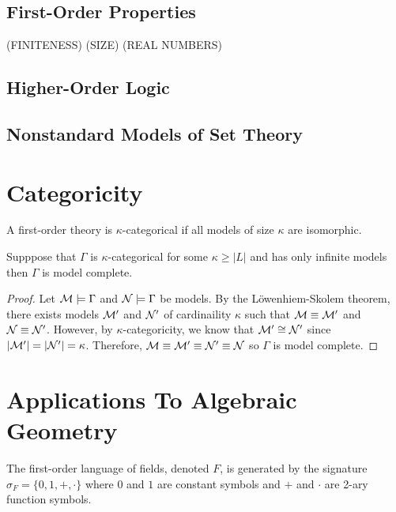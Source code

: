 \documentclass[12pt]{article}
\begin{document}
\subsection{First-Order Properties}

(FINITENESS)
(SIZE)
(REAL NUMBERS)

\subsection{Higher-Order Logic}

\subsection{Nonstandard Models of Set Theory}


\section{Categoricity}

\begin{definition}
A first-order theory is $\kappa$-categorical if all models of size $\kappa$ are isomorphic.
\end{definition}

\begin{theorem}[Vaught]
Supppose that $\Gamma$ is $\kappa$-categorical for some $\kappa \ge |L|$ and has only infinite models then $\Gamma$ is model complete.
\end{theorem}

\begin{proof}
Let $\mathcal{M} \models \Gamma$ and $\mathcal{N} \models \Gamma$ be models. By the L\"{o}wenhiem-Skolem theorem, there exists models $\mathcal{M}'$ and $\mathcal{N}'$ of cardinaility $\kappa$ such that $\mathcal{M} \equiv \mathcal{M}'$ and $\mathcal{N} \equiv \mathcal{N}'$. However, by $\kappa$-categoricity, we know that $\mathcal{M}' \cong \mathcal{N}'$ since $|\mathcal{M}'| = |\mathcal{N}'| = \kappa$. Therefore, $\mathcal{M} \equiv \mathcal{M}' \equiv \mathcal{N}' \equiv \mathcal{N}$ so $\Gamma$ is model complete.  
\end{proof}


\section{Applications To Algebraic Geometry}

\newcommand{\ACF}[1]{\mathrm{ACF}_{#1}}

\begin{definition}
The first-order language of fields, denoted $F$, is generated by the signature $\sigma_F = \{0,1,+,\cdot\}$ where $0$ and $1$ are constant symbols and $+$ and $\cdot$ are 2-ary function symbols. 
\end{definition}
\end{document}
